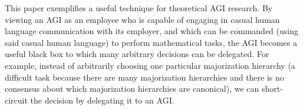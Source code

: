 \documentclass{article}
\begin{document}
This paper exemplifies a useful technique for theoretical AGI research.
By viewing an AGI as an employee who is capable of engaging in casual human
language communication with its employer, and which can be commanded (using said
casual human language) to perform mathematical tasks, the AGI becomes a useful
black box to which many arbitrary decisions can be delegated. For example, instead
of arbitrarily choosing one particular majorization hierarchy (a difficult task
because there are many majorization hierarchies and there is no consensus about
which majorization hierarchies are canonical), we can short-circuit the decision
by delegating it to an AGI.




\end{document}
